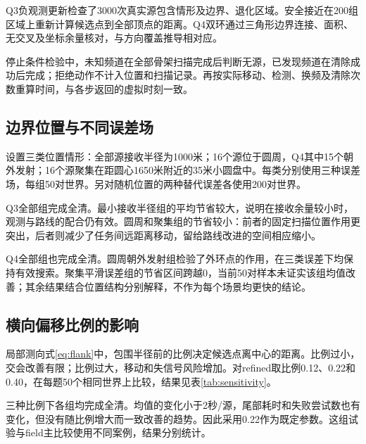 \documentclass[UTF8,fontset=fandol,a4paper,zihao=-4]{ctexart}
\begin{document}
Q3负观测更新检查了3000次真实源包含情形及边界、退化区域。安全接近在200组区域上重新计算候选点到全部顶点的距离。Q4双环通过三角形边界连接、面积、无交叉及坐标余量核对，与方向覆盖推导相对应。

停止条件检验中，未知频道在全部骨架扫描完成后判断无源，已发现频道在清除成功后完成；拒绝动作不计入位置和扫描记录。再按实际移动、检测、换频及清除次数重算时间，与各步返回的虚拟时刻一致。

\subsection{边界位置与不同误差场}
设置三类位置情形：全部源接收半径为1000米；16个源位于圆周，Q4其中15个朝外发射；16个源聚集在距圆心1650米附近的35米小圆盘中。每类分别使用三种误差场，每组50对世界。另对随机位置的两种替代误差各使用200对世界。

\begin{table}[H]\centering\small
\setlength{\tabcolsep}{3.5pt}
\caption{Q3边界与替代误差测试，时间单位：秒/源}\label{tab:stress-q3}
\StressThree
\end{table}
Q3全部组完成全清。最小接收半径组的平均节省较大，说明在接收余量较小时，观测与路线的配合仍有效。圆周和聚集组的节省较小：前者的固定扫描位置作用更突出，后者则减少了任务间远距离移动，留给路线改进的空间相应缩小。

\begin{table}[H]\centering\small
\setlength{\tabcolsep}{3.5pt}
\caption{Q4边界与替代误差测试，时间单位：秒/源}\label{tab:stress-q4}
\StressFour
\end{table}
Q4全部组也完成全清。圆周朝外发射组检验了外环点的作用，在三类误差下均保持有效搜索。聚集平滑误差组的节省区间跨越0，当前50对样本未证实该组均值改善；其余结果结合位置结构分别解释，不作为每个场景均更快的结论。

\subsection{横向偏移比例的影响}
局部测向式\eqref{eq:flank}中，包围半径前的比例决定候选点离中心的距离。比例过小，交会改善有限；比例过大，移动和失信号风险增加。对refined取比例0.12、0.22和0.40，在每题50个相同世界上比较，结果见表\ref{tab:sensitivity}。
\begin{table}[H]\centering\small
\caption{横向偏移比例的灵敏度试验（refined），时间单位：秒/源}\label{tab:sensitivity}
\SensitivityResults
\end{table}
三种比例下各组均完成全清。均值的变化小于2秒/源，尾部耗时和失败尝试数也有变化，但没有随比例增大而一致改善的趋势。因此采用0.22作为既定参数。这组试验与field主比较使用不同案例，结果分别统计。
\end{document}
